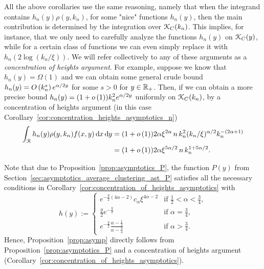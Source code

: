 \begin{remark}\label{rmk:concentration_argument}
All the above corollaries use the same reasoning, namely that when the integrand contains $h_n(y) \rho(y,k_n)$, for some "nice" functions $h_n(y)$, then the main contribution is determined by the integration over ${\mathcal K}_{C}(k_n)$.  This implies, for instance, that we only need to carefully analyze the functions $h_n(y)$ on ${\mathcal K}_{C}(y)$, while for a certain class of functions we can even simply replace it with $h_n(2\log(k_n/\xi))$. We will refer collectively to any of these arguments as a \emph{concentration of heights argument}. For example, suppose we know that $h_n(y) = \Omega(1)$ and we can obtain some general crude bound $h_n(y) = O\left(k_n^s\right) e^{\alpha/2 y}$ for some $s > 0$ for $y \in {\ensuremath{\mathbb R}}_+$. Then, if we can obtain a more precise bound $h_n(y) = (1 + o\left(1\right)) k_n^2 e^{\alpha/2 y}$ uniformly on ${\mathcal K}_{C}(k_n)$, by a concentration of heights argument (in this case Corollary~\ref{cor:concentration_heights_asymptotics_n})
\begin{align*}
	\int_{{\mathcal R}} h_n(y) \rho(y,k_n) f(x,y) \operatorname{\mathrm{d}\hspace{-2pt}} x \operatorname{\mathrm{d}\hspace{-2pt}} y 
	&= (1 + o\left(1\right)) 2 \alpha \xi^{2\alpha} \, n \, k_n^2 (k_n/\xi)^{\alpha/2} k_n^{-(2\alpha + 1)} \\
	&= (1 + o\left(1\right)) 2\alpha \xi^{5\alpha/2} \, n \, k_n^{1 + 5\alpha/2}.
\end{align*}
\end{remark}



\begin{remark}
Note that due to Proposition~\ref{prop:asymptotics_P}, the function $P(y)$ from Section~\ref{sec:asymptotics_average_clustering_ast_P} satisfies all the necessary conditions in Corollary~\ref{cor:concentration_of_heights_asymptotics} with
\[
	h(y) := \begin{cases}
		e^{-\frac{y}{2}(4\alpha - 2)} c_\alpha \xi^{4\alpha - 2} &\mbox{if } \frac{1}{2} < \alpha < \frac{3}{4},\\
		\frac{y}{2} e^{-\frac{y}{2}} &\mbox{if } \alpha = \frac{3}{4},\\
		e^{-\frac{y}{2}} \frac{\alpha - \frac{1}{2}}{\alpha - \frac{3}{4}} &\mbox{if } \alpha > \frac{3}{4}.
	\end{cases}
\] 
Hence, Proposition~\ref{prop:asymp} directly follows from Proposition~\ref{prop:asymptotics_P} and a concentration of heights argument (Corollary~\ref{cor:concentration_of_heights_asymptotics}).
\end{remark}


